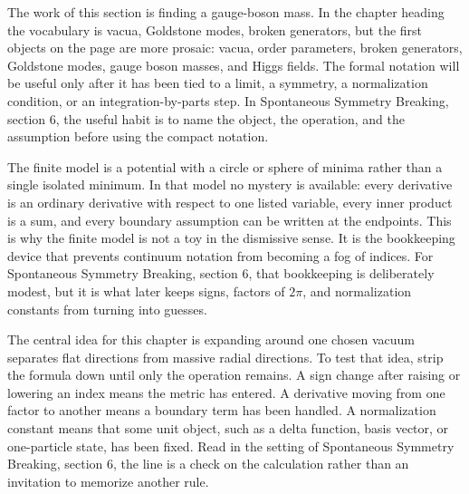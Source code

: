 











The work of this section is finding a gauge-boson mass.  In the chapter heading the vocabulary is vacua, Goldstone modes, broken generators, but the first objects on the page are more prosaic: vacua, order parameters, broken generators, Goldstone modes, gauge boson masses, and Higgs fields.  The formal notation will be useful only after it has been tied to a limit, a symmetry, a normalization condition, or an integration-by-parts step.  In Spontaneous Symmetry Breaking, section 6, the useful habit is to name the object, the operation, and the assumption before using the compact notation.

The finite model is a potential with a circle or sphere of minima rather than a single isolated minimum.  In that model no mystery is available: every derivative is an ordinary derivative with respect to one listed variable, every inner product is a sum, and every boundary assumption can be written at the endpoints.  This is why the finite model is not a toy in the dismissive sense.  It is the bookkeeping device that prevents continuum notation from becoming a fog of indices.  For Spontaneous Symmetry Breaking, section 6, that bookkeeping is deliberately modest, but it is what later keeps signs, factors of \(2\pi\), and normalization constants from turning into guesses.

The central idea for this chapter is expanding around one chosen vacuum separates flat directions from massive radial directions.  To test that idea, strip the formula down until only the operation remains.  A sign change after raising or lowering an index means the metric has entered.  A derivative moving from one factor to another means a boundary term has been handled.  A normalization constant means that some unit object, such as a delta function, basis vector, or one-particle state, has been fixed.  Read in the setting of Spontaneous Symmetry Breaking, section 6, the line is a check on the calculation rather than an invitation to memorize another rule.

